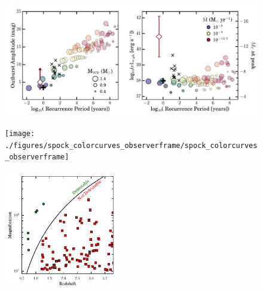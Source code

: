 \begin{figure}[tbp]
  \begin{center}
    \includegraphics[width=\textwidth]{./figures/recurrent_nova_recurrence_comparison/recurrent_nova_recurrence_comparison}
    \caption{\protect}
  \end{center}
\end{figure}

\begin{figure}[tbp]
  \begin{center}
    \texttt{[image: ./figures/spock\_colorcurves\_observerframe/spock\_colorcurves\_observerframe]}
    \caption{\protect}
  \end{center}
\end{figure}

\begin{figure}[tbp]
  \begin{center}
    \includegraphics[width=0.45\textwidth]{./figures/hff_lensed_galaxies/hff_lensed_galaxies}
    \caption{\protect}
  \end{center}
\end{figure}




